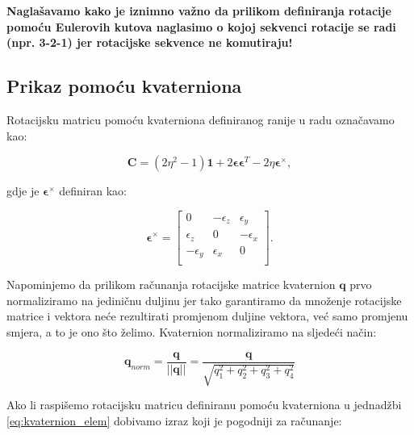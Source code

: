 \documentclass[times, utf8, diplomski, numeric]{templates/template}
\begin{document}
{{{            \textbf{Naglašavamo kako je iznimno važno da prilikom definiranja rotacije pomoću Eulerovih kutova naglasimo o kojoj sekvenci rotacije se radi (npr. 3-2-1) jer rotacijske sekvence ne komutiraju!}
        }

        \subsection{Prikaz pomoću kvaterniona}{
            Rotacijsku matricu pomoću kvaterniona definiranog ranije u radu označavamo kao:

            \begin{equation}
                \boldsymbol{C} = (2\eta^2-1)\boldsymbol{1} + 2\boldsymbol\epsilon\boldsymbol\epsilon^{T}-2\eta\boldsymbol\epsilon^{\times},
            \label{eq:quat_rot_matrix}
            \end{equation}

            gdje je $\boldsymbol\epsilon^{\times}$ definiran kao:

            \begin{equation}
                \boldsymbol\epsilon^{\times} =
                \begin{bmatrix}
                    0 & -\epsilon_{z} & \epsilon_{y} \\
                    \epsilon_{z} & 0 & -\epsilon_{x} \\
                    -\epsilon_{y} & \epsilon_{x} & 0 \\
                \end{bmatrix}
                .
            \end{equation}

            Napominjemo da prilikom računanja rotacijske matrice kvaternion $\boldsymbol{q}$ prvo normaliziramo na jediničnu duljinu jer tako garantiramo da množenje rotacijske matrice i vektora neće rezultirati promjenom duljine vektora, već samo promjenu smjera, a to je ono što želimo. Kvaternion normaliziramo na sljedeći način:

            \begin{equation}
                \boldsymbol{q}_{norm} = \frac{\boldsymbol{q}}{||\boldsymbol{q}||} = \frac{\boldsymbol{q}}{\sqrt{q_1^2 + q_2^2 + q_3^2 + q_4^2}}
            \end{equation}

            Ako li raspišemo rotacijsku matricu definiranu pomoću kvaterniona u jednadžbi \ref{eq:kvaternion_elem} dobivamo izraz \cite{uvod_u_svemirske} koji je pogodniji za računanje:

}}}
\end{document}
